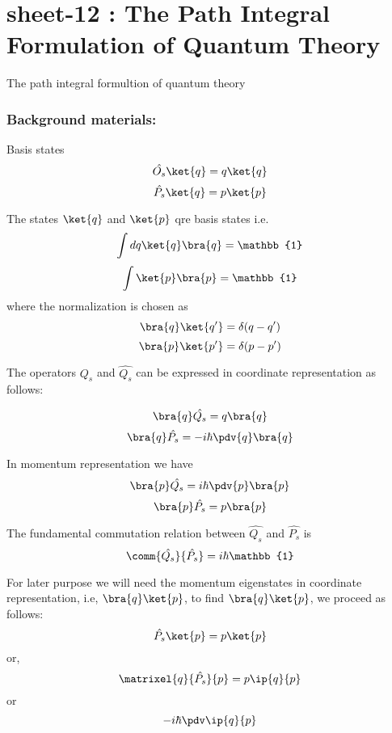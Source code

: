 \chapter{sheet-12 : The Path Integral Formulation of Quantum Theory}
\label{chapter1.path-intigral}

The path integral formultion of quantum theory

\subsection{Background materials:}

Basis states
		\[\hat{O_s} \ket{q} = q \ket{q} \]
		\[\hat{P_s} \ket{q} = p \ket{p} \]
		
	The states {$\ket{q}$} and {$\ket{p}$} qre basis states i.e. \\
	\[\int dq \ket{q}\bra{q} = \mathbb{1} \]
	\[\int \ket{p} \bra{p}  = \mathbb{1} \]
	where the normalization is chosen as 
	\[\bra{q}\ket{q'} = \delta(q-q') \]
	\[\bra{p}\ket{p'} = \delta(p-p') \]
	
	The operators $\hat{Q_s}$ and $\hat{Q_s}$ can be expressed in coordinate representation as follows:
	
	\[\bra{q}\hat{Q_s} = q\bra{q} \]
	\[\bra{q}\hat{P_s} = -i\hbar \pdv{q}  \bra{q} \]
	
	In momentum representation we have 
	\[\bra{p}\hat{Q_s}= i \hbar \pdv{p}\bra{p}   \]
	\[\bra{p}\hat{P_s}= p\bra{p} \]
	
	The fundamental commutation relation between $\hat{Q_s}$ and $\hat{P_s}$ is 
	\[ \comm{\hat{Q_s}}{\hat{P_s}} = i\hbar \mathbb{1} \]
	
	For later purpose we will need the momentum eigenstates in coordinate representation, i.e, $\bra{q}\ket{p}$, to find $\bra{q}\ket{p}$, we proceed as follows:
	\[\hat{P_s}\ket{p} = p\ket{p} \]
	or, \[ \matrixel{q}{\hat{P_s}}{p} = p \ip{q}{p}   \]
or \[ -i \hbar \pdv \ip{q}{p} \]
